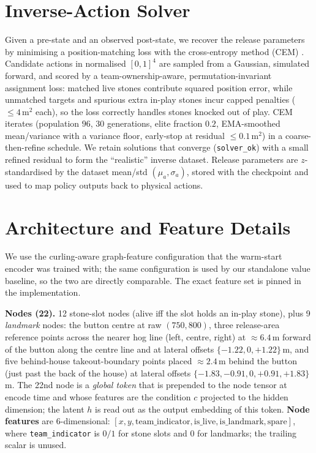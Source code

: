 \documentclass[11pt]{article}
\begin{document}
\section{Inverse-Action Solver}
\label{app:inverse}
Given a pre-state and an observed post-state, we recover the release
parameters by minimising a position-matching loss with the cross-entropy
method (CEM) \cite{deboer2005tutorial}. Candidate actions in normalised
$[0,1]^4$ are sampled from a Gaussian, simulated forward, and scored by a
team-ownership-aware, permutation-invariant assignment loss: matched live
stones contribute squared position error, while unmatched targets and
spurious extra in-play stones incur capped penalties ($\le 4\,\text{m}^2$
each), so the loss correctly handles stones knocked out of play. CEM
iterates (population $96$, $30$ generations, elite fraction $0.2$,
EMA-smoothed mean/variance with a variance floor, early-stop at residual
$\le 0.1\,\text{m}^2$) in a coarse-then-refine schedule. We retain solutions
that converge (\texttt{solver\_ok}) with a small refined residual to form
the ``realistic'' inverse dataset. Release parameters are $z$-standardised
by the dataset mean/std $(\mu_a,\sigma_a)$, stored with the checkpoint and
used to map policy outputs back to physical actions.

\section{Architecture and Feature Details}
\label{app:arch}
We use the curling-aware graph-feature configuration that the warm-start
encoder was trained with; the same configuration is used by our standalone
value baseline, so the two are directly comparable. The exact feature set
is pinned in the implementation.

\textbf{Nodes (22).} 12 stone-slot nodes (alive iff the slot holds an
in-play stone), plus 9 \emph{landmark} nodes: the button centre at raw
$(750, 800)$, three release-area reference points across the nearer hog
line (left, centre, right) at $\approx 6.4$\,m forward of the button along
the centre line and at lateral offsets $\{-1.22, 0, +1.22\}$\,m, and five
behind-house takeout-boundary points placed $\approx 2.4$\,m behind the
button (just past the back of the house) at lateral offsets $\{-1.83,
-0.91, 0, +0.91, +1.83\}$\,m. The 22nd node is a \emph{global token} that
is prepended to the node tensor at encode time and whose features are the
condition $c$ projected to the hidden dimension; the latent $h$ is read
out as the output embedding of this token. \textbf{Node features} are
6-dimensional: $[x, y, \text{team\_indicator}, \text{is\_live},
\text{is\_landmark}, \text{spare}]$, where \texttt{team\_indicator} is
$0/1$ for stone slots and $0$ for landmarks; the trailing scalar is
unused.
\end{document}
